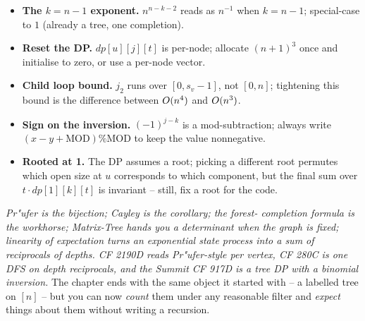 \begin{hardeningbox}
\begin{itemize}[nosep,leftmargin=1.4em]
\item \textbf{The \(k=n-1\) exponent.}  \(n^{n-k-2}\) reads as \(n^{-1}\)
when \(k=n-1\); special-case to \(1\) (already a tree, one completion).
\item \textbf{Reset the DP.}  \(dp[u][j][t]\) is per-node; allocate
\((n+1)^3\) once and initialise to zero, or use a per-node vector.
\item \textbf{Child loop bound.}  \(j_2\) runs over \([0, s_v-1]\), not
\([0,n]\); tightening this bound is the difference between \(O(n^4)\)
and \(O(n^3)\).
\item \textbf{Sign on the inversion.}  \((-1)^{j-k}\) is a mod-subtraction;
always write \((x-y+\text{MOD})\%\text{MOD}\) to keep the value nonnegative.
\item \textbf{Rooted at 1.}  The DP assumes a root; picking a different
root permutes which open size at \(u\) corresponds to which component,
but the final sum over \(t\cdot dp[1][k][t]\) is invariant -- still,
fix a root for the code.
\end{itemize}
\end{hardeningbox}

\begin{recallbox}
\emph{Pr"ufer is the bijection; Cayley is the corollary; the forest-
completion formula is the workhorse; Matrix-Tree hands you a determinant
when the graph is fixed; linearity of expectation turns an exponential
state process into a sum of reciprocals of depths.  CF 2190D reads
Pr"ufer-style per vertex, CF 280C is one DFS on depth reciprocals, and
the Summit CF 917D is a tree DP with a binomial inversion.}  The
chapter ends with the same object it started with -- a labelled tree on
\([n]\) -- but you can now \emph{count} them under any reasonable filter
and \emph{expect} things about them without writing a recursion.
\end{recallbox}

